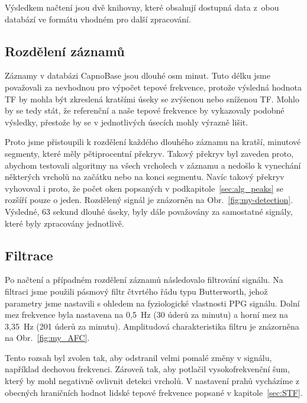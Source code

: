 Výsledkem načtení jsou dvě knihovny, které obsahují dostupná data z~obou databází ve formátu vhodném pro další zpracování.

\subsection*{Rozdělení záznamů}
\label{sec:alg_split}
Záznamy v databázi CapnoBase jsou dlouhé osm minut.
Tuto délku jsme považovali za nevhodnou pro výpočet tepové frekvence, protože výsledná hodnota \acs{TF} by mohla být zkreslená kratšími úseky se zvýšenou nebo sníženou \acs{TF}.
Mohlo by se tedy stát, že referenční a naše tepové frekvence by vykazovaly podobné výsledky, přestože by se v jednotlivých úsecích mohly výrazně lišit.

Proto jsme přistoupili k rozdělení každého dlouhého záznamu na kratší, minutové segmenty, které měly pětiprocentní překryv.
Takový překryv byl zaveden proto, abychom testovali algoritmy na všech vrcholech v záznamu a nedošlo k vynechání některých vrcholů na začátku nebo na konci segmentu.
Navíc takový překryv vyhovoval i proto, že počet oken popsaných v podkapitole~\ref{sec:alg_peaks} se rozšíří pouze o jeden.
Rozdělený signál je znázorněn na Obr.~\ref{fig:my-detection}.
Výsledné, 63 sekund dlouhé úseky, byly dále považovány za samostatné signály, které byly zpracovány jednotlivě.

\subsection*{Filtrace}
\label{sec:alg_filter}
Po načtení a případném rozdělení záznamů následovalo filtrování signálu.
Na filtraci jsme použili pásmový filtr čtvrtého řádu typu Butterworth, jehož parametry jsme nastavili s ohledem na fyziologické vlastnosti \acs{PPG} signálu.
Dolní mez frekvence byla nastavena na 0,5~Hz (30 úderů za minutu) a horní mez na 3,35~Hz (201 úderů za minutu).
Amplitudová charakteristika filtru je znázorněna na Obr.~\ref{fig:my_AFC}.

Tento rozsah byl zvolen tak, aby odstranil velmi pomalé změny v signálu, například dechovou frekvenci. Zároveň tak, aby potlačil vysokofrekvenční šum, který by mohl negativně ovlivnit detekci vrcholů.
V nastavení prahů vycházíme z obecných hraničních hodnot lidské tepové frekvence popsané v kapitole~\ref{sec:STF}.

